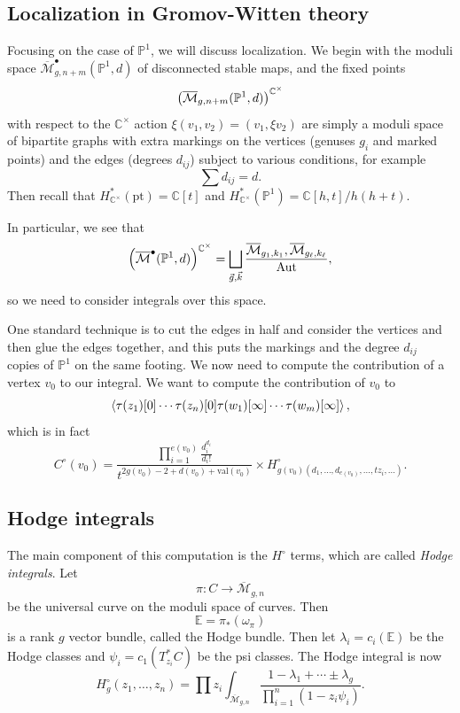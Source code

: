 \documentclass[leqno, openany]{memoir}
\theoremstyle{definition}
\theoremstyle{remark}
\theoremstyle{plain}
\theoremstyle{definition}
\theoremstyle{remark}
\newcommand{\E}{\mathbb{E}}
\newcommand{\C}{\mathbb{C}}
\renewcommand{\P}{\mathbb{P}}
\newcommand{\mc}[1]{\mathcal{#1}}
\newcommand{\mr}[1]{\mathrm{#1}}
\newcommand{\ol}[1]{\overline{#1}}
\DeclareMathOperator{\Aut}{Aut}
\begin{document}
\subsection{Localization in Gromov-Witten theory}

Focusing on the case of $\P^1$, we will discuss localization. We begin with the moduli space $\ol{\mc{M}}^{\bullet}_{g, n+m}(\P^1, d)$ of disconnected stable maps, and the fixed points 
\[ \qty(\ol{\mc{M}}_{g, n+m}(\P^1, d))^{\C^{\times}} \] 
with respect to the $\C^{\times}$ action $\xi (v_1, v_2) = (v_1, \xi v_2)$ are simply a moduli space of bipartite graphs with extra markings on the vertices (genuses $g_i$ and marked points) and the edges (degrees $d_{ij}$) subject to various conditions, for example
\[ \sum d_{ij} = d. \]
Then recall that $H^*_{\C^{\times}}(\mr{pt}) = \C[t]$ and $H^*_{\C^{\times}}(\P^1) = \C[h,t]/h(h+t)$. 

In particular, we see that
\[ \qty( \ol{\mc{M}}^{\bullet}(\P^1, d) )^{\C^{\times}} = \bigsqcup_{\vec{g}, \vec{k}} \frac{ \ol{\mc{M}}_{g_1, k_1}, \ol{\mc{M}}_{g_{\ell}, k_{\ell}} }{\Aut}, \]
so we need to consider integrals over this space.

One standard technique is to cut the edges in half and consider the vertices and then glue the edges together, and this puts the markings and the degree $d_{ij}$ copies of $\P^1$ on the same footing. We now need to compute the contribution of a vertex $v_0$ to our integral. We want to compute the contribution of $v_0$ to
\[ \ev{\tau(z_1)[0] \cdots \tau(z_n)[0] \tau(w_1)[\infty]\cdots\tau(w_m)[\infty]}, \]
which is in fact
\[ C^{\circ}(v_0) = \frac{\prod_{i=1}^{e(v_0)} \frac{d_i^{d_i}}{d_i!}}{t^{2g(v_0) - 2 + d(v_0) + \mr{val}(v_0)}} \times H^{\circ}_{g(v_0)(d_1, \ldots, d_{e(v_0)}, \ldots, tz_i, \ldots)}. \]

\subsection{Hodge integrals}

The main component of this computation is the $H^{\circ}$ terms, which are called \textit{Hodge integrals}. Let 
\[\pi \colon C \to \ol{\mc{M}}_{g,n} \] 
be the universal curve on the moduli space of curves. Then 
\[ \mathbb{E} = \pi_*(\omega_{\pi}) \] 
is a rank $g$ vector bundle, called the Hodge bundle. Then let $\lambda_i = c_i(\E)$ be the Hodge classes and $\psi_i = c_1(T^*_{z_i} C)$ be the psi classes. The Hodge integral is now
\[ H^{\circ}_g(z_1, \ldots, z_n) = \prod z_i \int_{\ol{\mc{M}}_{g, n}} \frac{1 - \lambda_1 + \cdots \pm \lambda_g}{\prod_{i=1}^n (1-z_i \psi_i)}. \]
\end{document}
